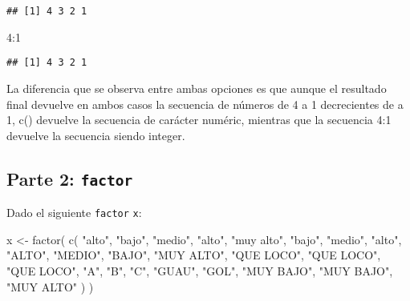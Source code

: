 \documentclass[
]{article}
\newenvironment{Shaded}{\begin{snugshade}}{\end{snugshade}}
\newcommand{\DecValTok}[1]{\textcolor[rgb]{0.00,0.00,0.81}{#1}}
\newcommand{\FunctionTok}[1]{\textcolor[rgb]{0.00,0.00,0.00}{#1}}
\newcommand{\NormalTok}[1]{#1}
\newcommand{\OtherTok}[1]{\textcolor[rgb]{0.56,0.35,0.01}{#1}}
\newcommand{\SpecialCharTok}[1]{\textcolor[rgb]{0.00,0.00,0.00}{#1}}
\newcommand{\StringTok}[1]{\textcolor[rgb]{0.31,0.60,0.02}{#1}}
\begin{document}
\begin{verbatim}
## [1] 4 3 2 1
\end{verbatim}

\begin{Shaded}
\begin{Highlighting}[]
\DecValTok{4}\SpecialCharTok{:}\DecValTok{1}
\end{Highlighting}
\end{Shaded}

\begin{verbatim}
## [1] 4 3 2 1
\end{verbatim}

La diferencia que se observa entre ambas opciones es que aunque el
resultado final devuelve en ambos casos la secuencia de números de 4 a 1
decrecientes de a 1, c() devuelve la secuencia de carácter numéric,
mientras que la secuencia 4:1 devuelve la secuencia siendo integer.

\hypertarget{parte-2-factor}{%
\subsection{\texorpdfstring{Parte 2:
\texttt{factor}}{Parte 2: factor}}\label{parte-2-factor}}

Dado el siguiente \texttt{factor} \texttt{x}:

\begin{Shaded}
\begin{Highlighting}[]
\NormalTok{x }\OtherTok{\textless{}{-}}
   \FunctionTok{factor}\NormalTok{(}
      \FunctionTok{c}\NormalTok{(}
         \StringTok{"alto"}\NormalTok{,}
         \StringTok{"bajo"}\NormalTok{,}
         \StringTok{"medio"}\NormalTok{,}
         \StringTok{"alto"}\NormalTok{,}
         \StringTok{"muy alto"}\NormalTok{,}
         \StringTok{"bajo"}\NormalTok{,}
         \StringTok{"medio"}\NormalTok{,}
         \StringTok{"alto"}\NormalTok{,}
         \StringTok{"ALTO"}\NormalTok{,}
         \StringTok{"MEDIO"}\NormalTok{,}
         \StringTok{"BAJO"}\NormalTok{,}
         \StringTok{"MUY ALTO"}\NormalTok{,}
         \StringTok{"QUE LOCO"}\NormalTok{,}
         \StringTok{"QUE LOCO"}\NormalTok{,}
         \StringTok{"QUE LOCO"}\NormalTok{,}
         \StringTok{"A"}\NormalTok{,}
         \StringTok{"B"}\NormalTok{,}
         \StringTok{"C"}\NormalTok{,}
         \StringTok{"GUAU"}\NormalTok{,}
         \StringTok{"GOL"}\NormalTok{,}
         \StringTok{"MUY BAJO"}\NormalTok{,}
         \StringTok{"MUY BAJO"}\NormalTok{,}
         \StringTok{"MUY ALTO"}
\NormalTok{      )}
\NormalTok{   )}
\end{Highlighting}
\end{Shaded}
\end{document}
